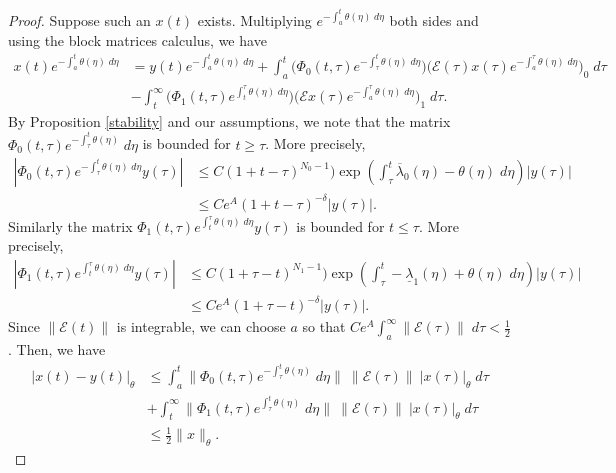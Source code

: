 \documentclass[a4paper,11pt]{article}
\newcommand{\upl}{\overline{\lambda}}
\newcommand{\udl}{\underline{\lambda}}
\newcommand{\E}{\mathcal{E}}
\theoremstyle{remark}
\begin{document}
\begin{proof}
 Suppose such an $x(t)$ exists. Multiplying $e^{-\int_a^t \theta(\eta) \;d\eta}$ both sides and using the block matrices calculus, we have
 \begin{equation} \label{eq:integral2}
 \begin{aligned}
  x(t)e^{-\int_a^t \theta(\eta) \;d\eta} &= y(t)e^{-\int_a^t \theta(\eta) \;d\eta} + \int_a^t \big(\Phi_0(t,\tau)e^{-\int_\tau^t \theta(\eta) \;d\eta}\big)\big(\E(\tau) x(\tau)e^{-\int_a^\tau \theta(\eta) \;d\eta}\big)_0 \;d\tau \\
  &- \int_t^\infty \big(\Phi_1(t,\tau)e^{\int_t^\tau \theta(\eta) \;d\eta}\big) \big(\E x(\tau)e^{-\int_a^\tau \theta(\eta) \;d\eta}\big)_1 \; d\tau.
 \end{aligned}
 \end{equation}
By Proposition \ref{stability} and our assumptions, we note that   the matrix $\Phi_0(t,\tau)e^{-\int_\tau^t \theta(\eta)}\;d\eta$  is bounded for $t\ge \tau$. More precisely,
\begin{align}
 \left|\Phi_0(t,\tau)e^{-\int_\tau^t \theta(\eta) \;d\eta}y(\tau)\right| &\le C(1 + t-\tau)^{N_0-1})\exp\left(\int_\tau^t \upl_0(\eta)-\theta(\eta) \;d\eta\right)|y(\tau)| \nonumber\\
 &\le Ce^A(1 + t-\tau)^{-\delta}|y(\tau)|. \label{eq:decay0}
\end{align}
Similarly the matrix $\Phi_1(t,\tau)e^{\int_t^\tau \theta(\eta)\;d\eta}y(\tau)$ is bounded for $t\le \tau$. More precisely,
\begin{align*}
 \left|\Phi_1(t,\tau)e^{\int_t^\tau \theta(\eta)\;d\eta}y(\tau)\right| &\le C(1 + \tau- t)^{N_1-1})\exp\left(\int_\tau^t -\udl_1(\eta)+\theta(\eta) \; d\eta\right)|y(\tau)| \nonumber\\
 &\le Ce^A(1 + \tau-t)^{-\delta}|y(\tau)|. %
\end{align*}
Since $\|\E(t)\|$ is integrable, we can choose $a$ so that $Ce^A\int_a^\infty \|\E(\tau)\| \;d\tau < \frac{1}{2}$. Then, we have
\begin{align*}
|x(t)-y(t)|_{\theta} &\le \int_a^t \|\Phi_0(t,\tau)e^{-\int_\tau^t \theta(\eta)}\;d\eta\| \:\|\E(\tau)\| \: |x(\tau)|_\theta \; d\tau \\
&+ \int_t^\infty \|\Phi_1(t,\tau)e^{\int_\tau^t \theta(\eta)}\;d\eta\| \: \|\E(\tau)\| \:|x(\tau)|_\theta \; d\tau\\
&\le \frac{1}{2}\|x\|_{\theta}.
\end{align*}


\end{proof}
\end{document}
